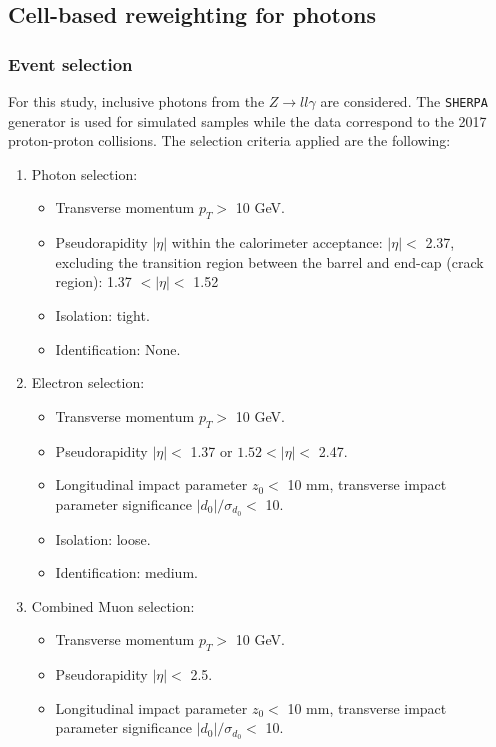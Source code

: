 \subsection{Cell-based reweighting for photons}
\label{gamma:ss:reweighting:photon}

\subsubsection{Event selection}
\label{gamma:ss:reweighting:photon:RadZSel}
For this study, inclusive photons from the $Z\rightarrow ll\gamma$ are considered. The \verb|SHERPA| generator is used for simulated samples while the data correspond to the 2017 proton-proton collisions. The selection criteria applied are the following:
\begin{enumerate}
    \item Photon selection:  
    \begin{itemize}
    \item Transverse momentum $p_T > $  10 GeV.
    \item Pseudorapidity $|\eta|$ within the calorimeter acceptance: $|\eta| < $ 2.37, excluding the transition region between the barrel and end-cap (crack region): 1.37 $ < |\eta| < $ 1.52
    \item Isolation: tight.
    \item Identification: None. 
\end{itemize}
    \item Electron selection:
    \begin{itemize}
        \item Transverse momentum $p_T > $ 10 GeV.
        \item Pseudorapidity $|\eta| < $ 1.37 or $1.52 < |\eta| < $ 2.47.
        \item Longitudinal impact parameter $z_0 < $ 10 mm, transverse impact parameter significance $|d_0|/\sigma_{d_0} < $ 10.
        \item Isolation: loose.
        \item Identification: medium.
    \end{itemize}
    \item Combined Muon selection: 
    \begin{itemize}
        \item Transverse momentum $p_T > $ 10 GeV.
        \item Pseudorapidity $|\eta| < $ 2.5.
        \item Longitudinal impact parameter $z_0 < $ 10 mm, transverse impact parameter significance $|d_0|/\sigma_{d_0} < $ 10.

\end{itemize}
\end{enumerate}
